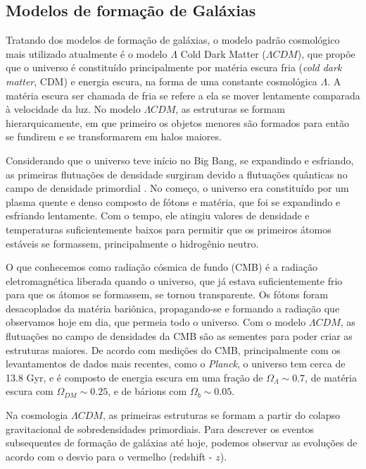 \subsection{Modelos de formação de Galáxias}\label{subsec:modelo_formacao_galaxias}

Tratando dos modelos de formação de galáxias, o modelo padrão cosmológico mais utilizado atualmente é o modelo $\Lambda$ Cold Dark Matter ($\Lambda CDM$), que propõe que o universo é constituído principalmente por matéria escura fria ({\it cold dark matter}, CDM) e energia escura, na forma de uma constante cosmológica $\Lambda$. A matéria escura ser chamada de fria se refere a ela se mover lentamente comparada à velocidade da luz. No modelo $\Lambda CDM$, as estruturas se formam hierarquicamente, em que primeiro os objetos menores são formados para então se fundirem e se transformarem em halos maiores.

Considerando que o universo teve início no Big Bang, se expandindo e esfriando, as primeiras flutuações de densidade surgiram devido a flutuações quânticas no campo de densidade primordial \citep{liddle_1999}. No começo, o universo era constituído por um plasma quente e denso composto de fótons e matéria, que foi se expandindo e esfriando lentamente. Com o tempo, ele atingiu valores de densidade e temperaturas suficientemente baixos para permitir que os primeiros átomos estáveis se formassem, principalmente o hidrogênio neutro.

O que conhecemos como radiação cósmica de fundo (CMB) é a radiação eletromagnética liberada quando o universo, que já estava suficientemente frio para que os átomos se formassem, se tornou transparente. Os fótons foram desacoplados da matéria bariônica, propagando-se e formando a radiação que observamos hoje em dia, que permeia todo o universo. Com o modelo $\Lambda CDM$, as flutuações no campo de densidades da CMB são as sementes para poder criar as estruturas maiores. De acordo com medições do CMB, principalmente com os levantamentos de dados mais recentes, como o \textit{Planck}, o universo tem cerca de 13.8 Gyr, e é composto de energia escura em uma fração de $\Omega_\Lambda \sim 0.7$, de matéria escura com $\Omega_{DM} \sim 0.25$, e de bárions com $\Omega_b \sim 0.05$.

Na cosmologia $\Lambda CDM$, as primeiras estruturas se formam a partir do colapso gravitacional de sobredensidades primordiais. Para descrever os eventos subsequentes de formação de galáxias até hoje, podemos observar as evoluções de acordo com o desvio para o vermelho (redshift - $z$).

